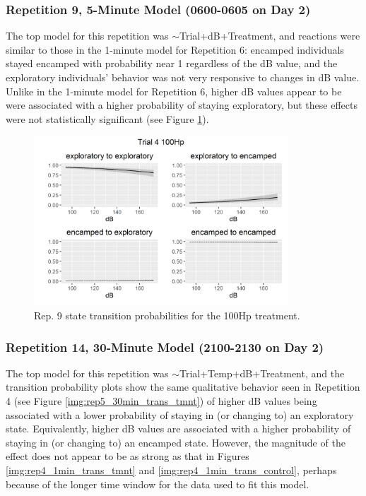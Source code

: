 \documentclass[12pt]{article}
\begin{document}
		\subsubsection{Repetition 9, 5-Minute Model (0600-0605 on Day 2)}
		
			The top model for this repetition was $\sim$Trial+dB+Treatment, and reactions were similar to those in the 1-minute model for Repetition 6: encamped individuals stayed encamped with probability near 1 regardless of the dB value, and the exploratory individuals' behavior was not very responsive to changes in dB value. Unlike in the 1-minute model for Repetition 6, higher dB values appear to be were associated with a higher probability of staying exploratory, but these effects were not statistically significant (see Figure \ref{img:rep9_5min_trans_tmnt}).
			
			\begin{figure}
				\centering
				\includegraphics[width=0.85\textwidth]{trans_rep_9_trial_4_100Hp.png}
				\caption{Rep. 9 state transition probabilities for the 100Hp treatment.}
				\label{img:rep9_5min_trans_tmnt}				
			\end{figure}
			
		
		\subsubsection{Repetition 14, 30-Minute Model (2100-2130 on Day 2)}
		
			The top model for this repetition was $\sim$Trial+Temp+dB+Treatment, and the transition probability plots show the same qualitative behavior seen in Repetition 4 (see Figure \ref{img:rep5_30min_trans_tmnt}) of higher dB values being associated with a lower probability of staying in (or changing to) an exploratory state. Equivalently, higher dB values are associated with a higher probability of staying in (or changing to) an encamped state. However, the magnitude of the effect does not appear to be as strong as that in Figures \ref{img:rep4_1min_trans_tmnt} and \ref{img:rep4_1min_trans_control}, perhaps because of the longer time window for the data used to fit this model.
			
\end{document}
